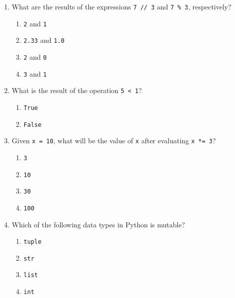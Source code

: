 \documentclass{article}
\begin{document}
\begin{enumerate}[leftmargin=0pt,label=\arabic*.]
  \item What are the results of the expressions \texttt{7 // 3} and \texttt{7 \% 3}, respectively?
  \begin{enumerate}[label=(\alph*)]
    \item \texttt{2} and \texttt{1}
    \item \texttt{2.33} and \texttt{1.0}
    \item \texttt{2} and \texttt{0}
    \item \texttt{3} and \texttt{1}
  \end{enumerate}

  \newpage

  \item What is the result of the operation \texttt{5 < 1}?
  \begin{enumerate}[label=(\alph*)]
    \item \texttt{True}
    \item \texttt{False}
  \end{enumerate}


  \item Given \texttt{x = 10}, what will be the value of \texttt{x} after evaluating \texttt{x *= 3}?
  \begin{enumerate}[label=(\alph*)]
    \item \texttt{3}
    \item \texttt{10}
    \item \texttt{30}
    \item \texttt{100}
  \end{enumerate}

  \item Which of the following data types in Python is mutable?
  \begin{enumerate}[label=(\alph*)]
    \item \texttt{tuple}
    \item \texttt{str}
    \item \texttt{list}
    \item \texttt{int}
  \end{enumerate}

\end{enumerate}
\end{document}
